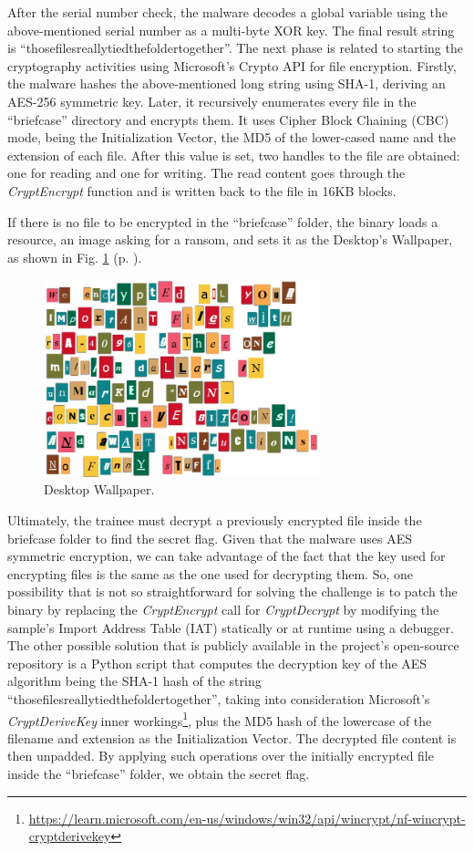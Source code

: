 After the serial number check, the malware decodes a global variable using the above-mentioned serial number as a multi-byte XOR key. The final result string is ``thosefilesreallytiedthefoldertogether''. The next phase is related to starting the cryptography activities using Microsoft's Crypto API for file encryption. Firstly, the malware hashes the above-mentioned long string using SHA-1, deriving an AES-256 symmetric key. Later, it recursively enumerates every file in the ``briefcase'' directory and encrypts them. It uses Cipher Block Chaining (CBC) mode, being the Initialization Vector, the MD5 of the lower-cased name and the extension of each file. After this value is set, two handles to the file are obtained: one for reading and one for writing. The read content goes through the \textit{CryptEncrypt} function and is written back to the file in 16KB blocks.

If there is no file to be encrypted in the ``briefcase'' folder, the binary loads a resource, an image asking for a ransom, and sets it as the Desktop's Wallpaper, as shown in Fig. \ref{fig:ida_5} (p. \pageref{fig:ida_5}).

\begin{figure}[H]
    \includegraphics[width=8cm]{figures/ida_5.png}
    \caption{Desktop Wallpaper.}
    \label{fig:ida_5}
\end{figure}

Ultimately, the trainee must decrypt a previously encrypted file inside the briefcase folder to find the secret flag. Given that the malware uses AES symmetric encryption, we can take advantage of the fact that the key used for encrypting files is the same as the one used for decrypting them. So, one possibility that is not so straightforward for solving the challenge is to patch the binary by replacing the \textit{CryptEncrypt} call for \textit{CryptDecrypt} by modifying the sample's Import Address Table (IAT) statically or at runtime using a debugger. The other possible solution that is publicly available in the project's open-source repository is a Python script that computes the decryption key of the AES algorithm being the SHA-1 hash of the string ``thosefilesreallytiedthefoldertogether'', taking into consideration Microsoft's \textit{CryptDeriveKey} inner workings\footnote{\url{https://learn.microsoft.com/en-us/windows/win32/api/wincrypt/nf-wincrypt-cryptderivekey}}, plus the MD5 hash of the lowercase of the filename and extension as the Initialization Vector. The decrypted file content is then unpadded. By applying such operations over the initially encrypted file inside the ``briefcase'' folder, we obtain the secret flag.

